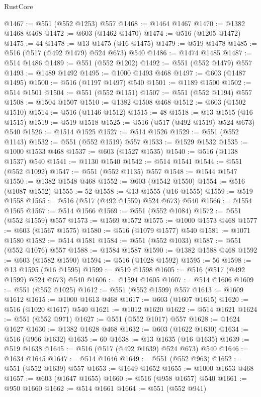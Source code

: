 \begin{lexlean}{RustCore}
\begin{coremodule}
@1467 := @551 (@552 @1253) @557
@1468 := @1464 @1467
@1470 := @1382 @1468 @468
@1472 := @603 (@1462 @1470)
@1474 := @516 (@1205 @1472)
@1475 := 44
@1478 := @13 @1475 (@16 @1475)
@1479 := @519 @1478
@1485 := @516 (@517 (@492 @1479) @524 @673) @540
@1486 := @1474 @1485
@1487 := @514 @1486
@1489 := @551 (@552 @1202)
@1492 := @551 (@552 @1479) @557
@1493 := @1489 @1492
@1495 := @1000 @1493 @468
@1497 := @603 (@1487 @1495)
@1500 := @516 (@1197 @1497) @540
@1501 := @1189 @1500
@1502 := @514 @1501
@1504 := @551 (@552 @1151)
@1507 := @551 (@552 @1194) @557
@1508 := @1504 @1507
@1510 := @1382 @1508 @468
@1512 := @603 (@1502 @1510)
@1514 := @516 (@1146 @1512)
@1515 := 48
@1518 := @13 @1515 (@16 @1515)
@1519 := @519 @1518
@1525 := @516 (@517 (@492 @1519) @524 @673) @540
@1526 := @1514 @1525
@1527 := @514 @1526
@1529 := @551 (@552 @1143)
@1532 := @551 (@552 @1519) @557
@1533 := @1529 @1532
@1535 := @1000 @1533 @468
@1537 := @603 (@1527 @1535)
@1540 := @516 (@1138 @1537) @540
@1541 := @1130 @1540
@1542 := @514 @1541
@1544 := @551 (@552 @1092)
@1547 := @551 (@552 @1135) @557
@1548 := @1544 @1547
@1550 := @1382 @1548 @468
@1552 := @603 (@1542 @1550)
@1554 := @516 (@1087 @1552)
@1555 := 52
@1558 := @13 @1555 (@16 @1555)
@1559 := @519 @1558
@1565 := @516 (@517 (@492 @1559) @524 @673) @540
@1566 := @1554 @1565
@1567 := @514 @1566
@1569 := @551 (@552 @1084)
@1572 := @551 (@552 @1559) @557
@1573 := @1569 @1572
@1575 := @1000 @1573 @468
@1577 := @603 (@1567 @1575)
@1580 := @516 (@1079 @1577) @540
@1581 := @1071 @1580
@1582 := @514 @1581
@1584 := @551 (@552 @1033)
@1587 := @551 (@552 @1076) @557
@1588 := @1584 @1587
@1590 := @1382 @1588 @468
@1592 := @603 (@1582 @1590)
@1594 := @516 (@1028 @1592)
@1595 := 56
@1598 := @13 @1595 (@16 @1595)
@1599 := @519 @1598
@1605 := @516 (@517 (@492 @1599) @524 @673) @540
@1606 := @1594 @1605
@1607 := @514 @1606
@1609 := @551 (@552 @1025)
@1612 := @551 (@552 @1599) @557
@1613 := @1609 @1612
@1615 := @1000 @1613 @468
@1617 := @603 (@1607 @1615)
@1620 := @516 (@1020 @1617) @540
@1621 := @1012 @1620
@1622 := @514 @1621
@1624 := @551 (@552 @971)
@1627 := @551 (@552 @1017) @557
@1628 := @1624 @1627
@1630 := @1382 @1628 @468
@1632 := @603 (@1622 @1630)
@1634 := @516 (@966 @1632)
@1635 := 60
@1638 := @13 @1635 (@16 @1635)
@1639 := @519 @1638
@1645 := @516 (@517 (@492 @1639) @524 @673) @540
@1646 := @1634 @1645
@1647 := @514 @1646
@1649 := @551 (@552 @963)
@1652 := @551 (@552 @1639) @557
@1653 := @1649 @1652
@1655 := @1000 @1653 @468
@1657 := @603 (@1647 @1655)
@1660 := @516 (@958 @1657) @540
@1661 := @950 @1660
@1662 := @514 @1661
@1664 := @551 (@552 @941)

\end{coremodule}
\end{lexlean}
